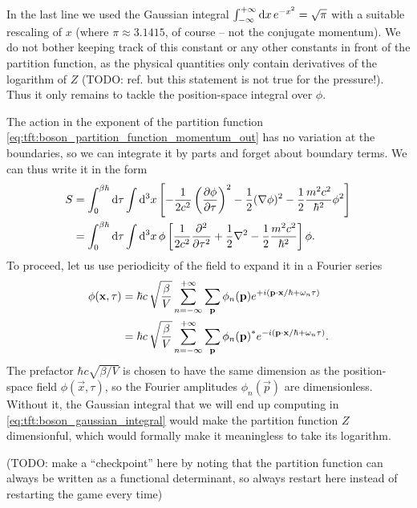 In the last line we used the Gaussian integral $\int_{-\infty}^{+\infty} \mathop{}\!\mathrm{d} x \, e^{-x^2} = \sqrt{\pi}$ with a suitable rescaling of $x$ (where $\pi \approx 3.1415$, of course -- not the conjugate momentum).
We do not bother keeping track of this constant or any other constants in front of the partition function, as the physical quantities only contain derivatives of the logarithm of $Z$ (TODO: ref. but this statement is not true for the pressure!).
Thus it only remains to tackle the position-space integral over $\phi$.

The action in the exponent of the partition function \eqref{eq:tft:boson_partition_function_momentum_out} has no variation at the boundaries, so we can integrate it by parts and forget about boundary terms.
We can thus write it in the form
\begin{equation}
\begin{split}
	S & = \int_0^{\beta \hbar} \mathop{}\!\mathrm{d} \tau \int \mathop{}\!\mathrm{d}^3 x \left[ - \frac{1}{2c^2} \pdv{\phi}{\tau}^2 - \frac12 (\nabla \phi)^2 - \frac12 \frac{m^2 c^2}{\hbar^2} \phi^2 \right] \\
	  & = \int_0^{\beta \hbar} \mathop{}\!\mathrm{d} \tau \int \mathop{}\!\mathrm{d}^3 x \, \phi \left[ \frac{1}{2c^2} \pdv[2]{}{\tau} + \frac12 \nabla^2 - \frac12 \frac{m^2 c^2}{\hbar^2} \right] \phi .
\end{split}
\end{equation}
To proceed, let us use periodicity of the field to expand it in a Fourier series
\begin{equation}
\begin{split}
	\phi(\mathbf{x}, \tau) & = \hbar c \, \sqrt{\frac{\beta}{V}} \sum_{n=-\infty}^{+\infty} \sum_{\mathbf{p}}       \phi_n(\mathbf{p})  e^{+i (\mathbf{p} \cdot \mathbf{x} / \hbar + \omega_n \tau)} \\
	                    & = \hbar c \, \sqrt{\frac{\beta}{V}} \sum_{n=-\infty}^{+\infty} \sum_{\mathbf{p}} {\phi_n(\mathbf{p})}^* e^{-i (\mathbf{p} \cdot \mathbf{x} / \hbar + \omega_n \tau)} .
\end{split}
\end{equation}
The prefactor $\hbar c \sqrt{\beta/V}$ is chosen to have the same dimension as the position-space field $\phi(\vec{x}, \tau)$, so the Fourier amplitudes $\phi_n(\vec{p})$ are dimensionless.
Without it, the Gaussian integral that we will end up computing in \cref{eq:tft:boson_gaussian_integral} would make the partition function $Z$ dimensionful, which would formally make it meaningless to take its logarithm.

(TODO: make a ``checkpoint'' here by noting that the partition function can always be written as a functional determinant, so always restart here instead of restarting the game every time)

